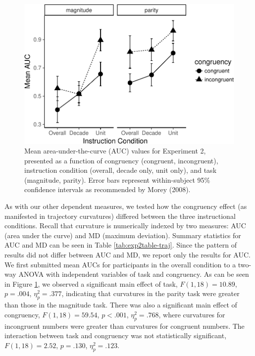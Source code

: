 \documentclass[english,man]{apa6}
\theoremstyle{definition}
\theoremstyle{definition}
\theoremstyle{definition}
\theoremstyle{remark}
\begin{document}
\begin{figure}
\centering
\includegraphics{paper_files/figure-latex/exp2-auc-1.pdf}
\caption{\label{fig:exp2-auc}Mean area-under-the-curve (AUC) values for
Experiment 2, presented as a function of congruency (congruent,
incongruent), instruction condition (overall, decade only, unit only),
and task (magnitude, parity). Error bars represent within-subject 95\%
confidence intervals as recommended by Morey (2008).}
\end{figure}

As with our other dependent measures, we tested how the congruency
effect (as manifested in trajectory curvatures) differed between the
three instructional conditions. Recall that curvature is numerically
indexed by two measures: AUC (area under the curve) and MD (maximum
deviation). Summary statistics for AUC and MD can be seen in Table
\ref{tab:exp2table-traj}. Since the pattern of results did not differ
between AUC and MD, we report only the results for AUC. We first
submitted mean AUCs for participants in the overall condition to a
two-way ANOVA with independent variables of task and congruency. As can
be seen in Figure \ref{fig:exp2-auc}, we observed a significant main
effect of task, \(F(1, 18) = 10.89\), \(p = .004\), \(\eta^2_p = .377\),
indicating that curvatures in the parity task were greater than those in
the magnitude task. There was also a significant main effect of
congruency, \(F(1, 18) = 59.54\), \(p < .001\), \(\eta^2_p = .768\),
where curvatures for incongruent numbers were greater than curvatures
for congruent numbers. The interaction between task and congruency was
not statistically significant, \(F(1, 18) = 2.52\), \(p = .130\),
\(\eta^2_p = .123\).
\end{document}
